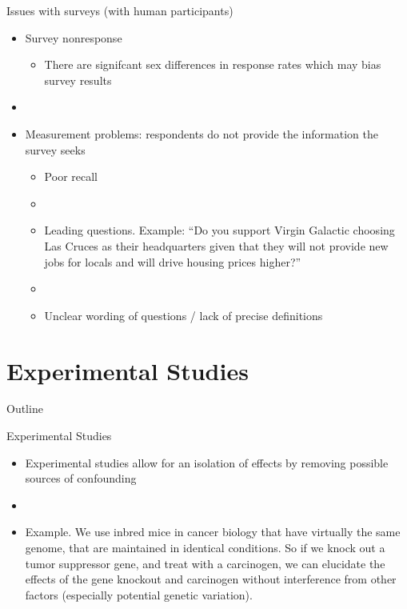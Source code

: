 \documentclass[xcolor=dvipsnames]{beamer}
\begin{document}
\begin{frame}{Issues with surveys (with human participants)}
\begin{itemize}
	\item Survey nonresponse
	\begin{itemize}
		\item There are signifcant sex differences in response rates which may bias survey results
	\end{itemize}
	\item[]
	\item Measurement problems: respondents do not provide the information the survey seeks
	\begin{itemize}
		\item Poor recall 
		\item[]
		\item Leading questions. Example: ``Do you support Virgin Galactic choosing Las Cruces as their headquarters given that they will not provide new jobs for locals and will drive housing prices higher?''
		\item[]
		\item Unclear wording of questions / lack of precise definitions 
	\end{itemize}
\end{itemize}
\end{frame}

\section{Experimental Studies}
\begin{frame}{Outline}
\tableofcontents[currentsection,subsectionstyle=show/shaded/hide]
\end{frame}
\begin{frame}{Experimental Studies}
	\begin{itemize}
		\item Experimental studies allow for an isolation of effects by removing possible sources of confounding
		
		\item[]
		
		\item Example. We use inbred mice in cancer biology that have virtually the same genome, that are maintained in identical conditions. So if we knock out a tumor suppressor gene, and treat with a carcinogen, we can elucidate the effects of the gene knockout and carcinogen without interference from other factors (especially potential genetic variation).
		
	\end{itemize}
\end{frame}
\end{document}
